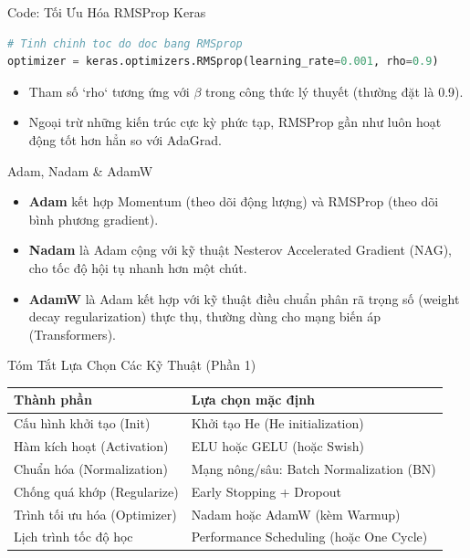 \documentclass[aspectratio=169]{beamer}
\begin{document}
\begin{frame}[fragile]{Code: Tối Ưu Hóa RMSProp Keras}
\begin{lstlisting}[language=Python]
# Tinh chinh toc do doc bang RMSprop
optimizer = keras.optimizers.RMSprop(learning_rate=0.001, rho=0.9)
\end{lstlisting}
    \begin{itemize}
        \item Tham số `rho` tương ứng với $\beta$ trong công thức lý thuyết (thường đặt là 0.9).
        \item Ngoại trừ những kiến trúc cực kỳ phức tạp, RMSProp gần như luôn hoạt động tốt hơn hẳn so với AdaGrad.
    \end{itemize}
\end{frame}

\begin{frame}{Adam, Nadam \& AdamW}
    \begin{itemize}
        \item \textbf{Adam} kết hợp Momentum (theo dõi động lượng) và RMSProp (theo dõi bình phương gradient).
        \item \textbf{Nadam} là Adam cộng với kỹ thuật Nesterov Accelerated Gradient (NAG), cho tốc độ hội tụ nhanh hơn một chút.
        \item \textbf{AdamW} là Adam kết hợp với kỹ thuật điều chuẩn phân rã trọng số (weight decay regularization) thực thụ, thường dùng cho mạng biến áp (Transformers).
    \end{itemize}
\end{frame}

\begin{frame}{Tóm Tắt Lựa Chọn Các Kỹ Thuật (Phần 1)}
    \begin{table}
        \centering
        \small
        \begin{tabular}{ll}
        \hline
        \textbf{Thành phần}           & \textbf{Lựa chọn mặc định}                 \\ \hline
        Cấu hình khởi tạo (Init)      & Khởi tạo He (He initialization)            \\
        Hàm kích hoạt (Activation)    & ELU hoặc GELU (hoặc Swish)                 \\
        Chuẩn hóa (Normalization)     & Mạng nông/sâu: Batch Normalization (BN)    \\
        Chống quá khớp (Regularize)   & Early Stopping + Dropout                   \\
        Trình tối ưu hóa (Optimizer)  & Nadam hoặc AdamW (kèm Warmup)              \\
        Lịch trình tốc độ học         & Performance Scheduling (hoặc One Cycle)    \\ \hline
        \end{tabular}
    \end{table}
\end{frame}
\end{document}
